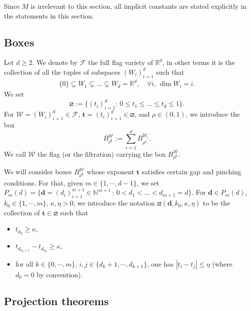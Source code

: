 \documentclass[11pt, leqno, fleqn]{amsart}
\def\cW{\mathcal W}
\def\eps{\varepsilon}
\newcommand{\margem}[1]{\marginpar{{\scriptsize {#1}}}}
\def\cF{          \mathcal F}
\def\clo{   \color{orange}}
\def\bt{        \mathbf{t}}
\def \R{{\mathbb R}}
\def \N{{\mathbb N}}
\newcommand{\bd}{\mathbf{d}}
\DeclareMathOperator{\leb}{Leb}
\newcommand{\increasing}{\boxslash}         %
\newcommand{\aryst}{\begin{eqnarray*}}
\newcommand{\earyst}{\end{eqnarray*}}
\theoremstyle{definition}
\theoremstyle{definition}
\begin{document}
Since $M$ is irrelevant to this section, all implicit constants are stated explicitly in the statements in this section.
		 
	\subsection{Boxes}  
		Let $d\geq2$.  We denote by $\cF$ the full flag variety of $\R^d$, in other terms it is the collection of all the tuples  of subspaces $(W_{i})_{i=1}^{d}$ such that 
		 \aryst
		 \{0\}\subsetneq  W_{1}\subsetneq \dots  \subsetneq W_{d}=\R^d, \quad \forall i, \,\dim W_{i}=  i.
		 \earyst
		 We set
		 $$ \increasing:=\{(t_{i})_{i=1}^{d} :\,  0\leq t_{1} \leq \dots  \leq t_{d}\leq 1\}.$$
		For $\cW=(W_{i})_{i=1}^{d} \in \cF$, $\bt=(t_{i})_{i=1}^{d}\in   \increasing $, and $\rho\in (0, 1)$,  we introduce the box
		 $$B_{\rho^\bt}^{\cW} :=\sum_{i=1}^{d} B^{W_{i}}_{\rho^{t_{i}}}.$$
 		 We call $\cW$ the flag (or the filtration) carrying the box $B_{\rho^\bt}^{\cW}$.   
	
		  We will consider boxes $B_{\rho^\bt}^{\cW}$ whose exponent $\bt$ satisfies certain gap and pinching conditions. For that, given $m\in \{ 1, \cdots, d-1\}$, we set  $P_{m}(d)=\{\bd=(d_{i})_{i=1}^{m+1}\in \N^{m+1}\,:\, 0<d_{1}<\dots <d_{m+1}=d \}$. For $\bd\in P_{m}(d)$, $k_{0}\in \{1, \cdots, m\}$, $ \kappa, \eta>0$, we introduce the notation 
		 $\increasing(\bd, k_{0}, \kappa, \eta)$ to be the collection of $\bt \in \increasing$ such that 
		 \begin{itemize}
		 \item $t_{d_{2}}\geq \kappa$,
		 \item $t_{d_{k_{0} +1}}-t_{d_{k_{0}}}\geq \kappa$,
		 \item for all $k\in \{  0, \cdots, m \}$, $i,j\in \{   d_{k}+1,  \cdots, d_{k+1} \}$, one has $|t_{i}-t_{j}|\leq \eta$ (where $d_{0}=0$ by convention).
		 \end{itemize} 
		 
	 \subsection{Projection theorems} 
		
\end{document}
